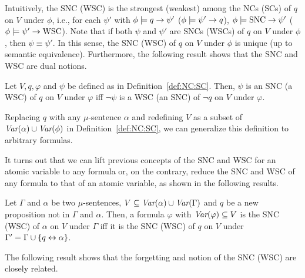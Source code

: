 \documentclass[runningheads]{llncs}
\begin{document}
Intuitively, the SNC (WSC) is the strongest (weakest) among the NCs (SCs) of $q$ on $V$ under $\phi$, i.e., for each $\psi'$ with $\phi \models q \rightarrow \psi'$ ($\phi \models \psi' \rightarrow q$), $\phi \models \hbox{SNC} \rightarrow \psi'$ ($\phi \models \psi' \rightarrow \hbox{WSC}$).
Note that if both $\psi$ and $\psi'$ are SNCs (WSCs) of $q$ on $V$ under $\phi$, then
$\psi\equiv \psi'$. %
In this sense, the SNC (WSC) of $q$ on $V$ under $\phi$ is unique (up to semantic equivalence). Furthermore, the following result shows that the SNC and WSC are dual notions.

\begin{proposition}[Dual]\label{dual}
 Let $V,q,\varphi$ and $\psi$ be defined as in Definition~\ref{def:NC:SC}.
 Then, $\psi$ is an SNC (a WSC) of $q$ on $V$ under $\varphi$ iff $\neg \psi$ is a WSC (an SNC)
    of $\neg q$ on $V$ under $\varphi$.
\end{proposition}


Replacing $q$ with any $\mu$-sentence $\alpha$ and redefining $V$  as a subset of $\textit{Var}(\alpha) \cup \textit{Var}(\phi)$ in Definition~\ref{def:NC:SC}, we can generalize this definition to arbitrary formulas.

It turns out that we can lift previous concepts of the SNC and WSC for an  atomic variable to any formula or, on the contrary, reduce the SNC and WSC of any formula to that of an atomic variable, as shown in the following results.


\begin{proposition}\label{formulaNS_to_p}
     Let $\Gamma$ and $\alpha$ be two $\mu$-sentences, $V \subseteq \textit{Var}(\alpha) \cup \textit{Var}(\Gamma)$  and $q$ be a new proposition not in $\Gamma$ and $\alpha$.
 Then, a formula $\varphi$ with $\textit{Var}(\varphi) \subseteq V$ is the SNC (WSC) of $\alpha$ on $V$ under  $\Gamma$ iff it is the SNC (WSC) of $q$ on $V$ under $\Gamma' = \Gamma \cup \{q \leftrightarrow \alpha\}$.
 \end{proposition}


The following result shows that the forgetting and notion of the SNC (WSC) are closely related.%
\end{document}
